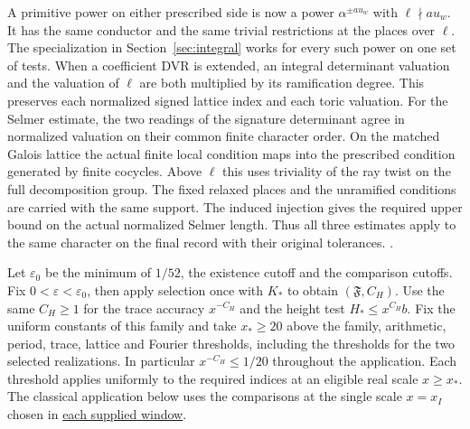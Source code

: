 A primitive power on either prescribed side
is now a power \(\alpha^{\pm a u_w}\) with \(\ell\nmid a u_w\).
It has the same conductor and the same trivial restrictions at
the places over \(\ell\). The specialization in
Section~\ref{sec:integral} works for every such power on one
set of tests. When a coefficient DVR is extended, an integral
determinant valuation and the valuation of \(\ell\) are both
multiplied by its ramification degree. This preserves each
normalized signed lattice index and each toric valuation.
For the Selmer estimate, the two readings of the signature
determinant agree in normalized valuation on their common finite
character order. On the matched Galois lattice the actual finite
local condition maps into the prescribed condition generated by
finite cocycles. Above \(\ell\) this uses triviality of the ray
twist on the full decomposition group. The fixed relaxed places
and the unramified conditions are carried with the same support.
The induced injection gives the required upper bound on the actual
normalized Selmer length. Thus all three estimates apply to the
same character on the final record with their original tolerances.
.

%
Let \(\varepsilon_0\) be the minimum of \(1/52\), the existence cutoff
and the comparison cutoffs. Fix \(0<\varepsilon<\varepsilon_0\),
then apply selection once with \(K_*\) to obtain \((\mathfrak F,C_H)\).
Use the same \(C_H\ge1\) for the trace accuracy \(x^{-C_H}\) and the
height test \(H_*\le x^{C_H}b\).
Fix the uniform constants of this family and take \(x_*\ge20\)
above the family, arithmetic, period, trace, lattice and Fourier
thresholds, including the thresholds for the two selected realizations.
In particular \(x^{-C_H}\le1/20\) throughout the application.
Each threshold applies uniformly to the required indices at an eligible
real scale \(x\ge x_*\). The classical application below uses the
comparisons at the single scale \(x=x_I\) chosen in
\hyperlink{proof.classical-window-test-scale}{each supplied window}.

